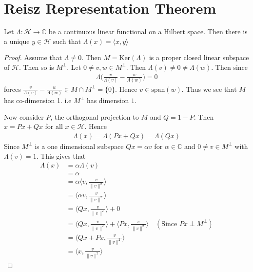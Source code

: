 

\section{Reisz Representation Theorem}

\begin{theorem}
  Let $\Lambda: \mathcal{H} \to \mathbb{C}$ be a continuous linear
  functional on a Hilbert space. Then there is a unique $y \in
  \mathcal{H}$ such that $\Lambda(x) = \langle x , y \rangle $
\end{theorem}
\begin{proof}
  Assume that $\Lambda \neq 0$. Then $M = \textrm{Ker}(\Lambda)$ is a proper
  closed linear subspace of $\mathcal{H}$. Then so is $M^\perp$. Let
  $0 \neq v, w \in M^\perp$. Then $\Lambda(v) \neq 0 \neq
  \Lambda(w)$. Then since
  \begin{align*}
    \Lambda \Big( \frac{v}{\Lambda(v)} - \frac{w}{\Lambda(w)} \Big) = 0
  \end{align*}
  forces $\frac{v}{\Lambda(v)} - \frac{w}{\Lambda(w)} \in M \cap
  M^\perp = \{ 0 \}$. Hence $v \in \textrm{span}(w)$. Thus we see
  that $M$ has co-dimension 1. i.e $M^\perp$ has dimension $1$.

  Now consider $P$, the orthogonal projection to $M$ and $Q = 1 - P$.
  Then $ x = Px + Qx$ for all $ x \in \mathcal{H}$. Hence
  \begin{align*}
    \Lambda(x) = \Lambda(Px + Qx)  = \Lambda(Qx)
  \end{align*}
  Since $M^\perp$ is a one dimensional subspace $ Qx = \alpha v$ for
  $ \alpha \in \mathbb{C}$ and $0 \neq v \in M^\perp$ with
  $\Lambda(v) = 1$. This gives that
  \begin{align*}
    \Lambda(x) &= \alpha \Lambda(v)  \\
    &= \alpha \\
    &= \alpha \langle v , \frac{v}{\|v\|^2} \rangle \\
    &= \langle \alpha v , \frac{v}{\|v\|^2} \rangle \\
    &= \langle Qx , \frac{v}{\|v\|^2} \rangle  + 0\\
    &=\langle Qx , \frac{v}{\|v\|^2} \rangle + \langle Px ,
    \frac{v}{\|v\|^2} \rangle \quad (\textrm{Since } Px \perp M^\perp) \\
    &= \langle Qx + Px , \frac{v}{\|v\|^2} \rangle \\
    &= \langle x , \frac{v}{\|v\|^2} \rangle
  \end{align*}
\end{proof}

